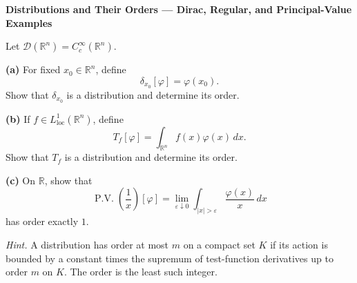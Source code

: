 \begin{problem}[CP-II-0086]
\label{prob:cp-ii-0086}
\textbf{Distributions and Their Orders --- Dirac, Regular, and Principal-Value Examples}

\hspace*{1.5em}Let \(\mathcal D(\mathbb R^n)=C_c^\infty(\mathbb R^n)\).

\par\smallskip\noindent\textbf{(a)}\quad
For fixed \(x_0\in\mathbb R^n\), define
\[
\delta_{x_0}[\varphi]=\varphi(x_0).
\]
Show that \(\delta_{x_0}\) is a distribution and determine its order.

\par\smallskip\noindent\textbf{(b)}\quad
If \(f\in L^1_{\mathrm{loc}}(\mathbb R^n)\), define
\[
T_f[\varphi]=\int_{\mathbb R^n}f(x)\varphi(x)\,dx.
\]
Show that \(T_f\) is a distribution and determine its order.

\par\smallskip\noindent\textbf{(c)}\quad
On \(\mathbb R\), show that
\[
\operatorname{P.V.}\!\left(\frac1x\right)[\varphi]
=
\lim_{\varepsilon\downarrow0}
\int_{|x|>\varepsilon}\frac{\varphi(x)}x\,dx
\]
has order exactly \(1\).

\medskip
\noindent\emph{Hint.} A distribution has order at most \(m\) on a compact set \(K\) if its action
is bounded by a constant times the supremum of test-function derivatives up
to order \(m\) on \(K\). The order is the least such integer.
\end{problem}

